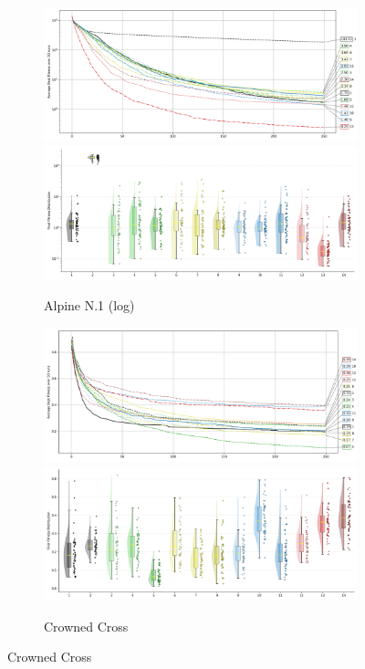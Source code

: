 


\vfill


\begin{figure}[H]
\renewcommand\thesubfigure{C.\arabic{figure}.\arabic{subfigure}} %

    \centering

    \begin{subfigure}{1\textwidth}
    \centering
    \includegraphics[width=.49\textwidth]{Figures/results/500/Alpine_N1_All_selected_algorithms_dim500_annot_legend.png}
    \includegraphics[width=.49\textwidth]{Figures/results/500/Alpine_N1_all_dim500_raincloud_vertical.png}
    \caption{Alpine N.1 (log)}
\end{subfigure}

\begin{subfigure}{1\textwidth}
    \centering
    \includegraphics[width=.49\textwidth]{Figures/results/500/Crowned_Cross_All_selected_algorithms_dim500_annot_legend.png}
    \includegraphics[width=.49\textwidth]{Figures/results/500/Crowned_Cross_all_dim500_raincloud_vertical.png}
    \caption{Crowned Cross}
\end{subfigure}


\end{figure}
